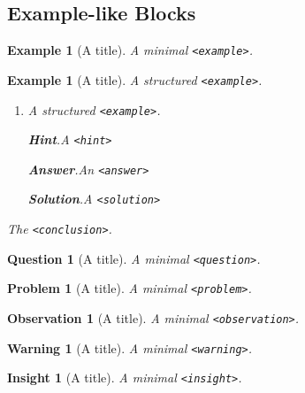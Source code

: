 \documentclass[pdflatex]{sn-jnl}
\theoremstyle{thmstyleone}%
\theoremstyle{thmstyletwo}%
\newtheorem{question}[theorem]{Question}
\newtheorem{problem}[theorem]{Problem}
\newtheorem{example}[theorem]{Example}
\theoremstyle{thmstylethree}%
\newtheorem{warning}[theorem]{Warning}
\newtheorem{insight}[theorem]{Insight}
\newtheorem{observation}[theorem]{Observation}
\newcommand{\blocktitlefont}{\relax}
\newcommand{\mono}[1]{\texttt{#1}}
\numberwithin{equation}{section}
\begin{document}
\subsection{Example-like Blocks}\label{block-samples-example-like}%
\begin{example}[A title]\label{block-samples-example-like-2}%
%
A minimal \mono{<example>}.%
\end{example}
\begin{example}[A title]\label{block-samples-example-like-3}%
%
A structured \mono{<example>}.%
\begin{enumerate}[font=\bfseries,label=(\alph*),ref=\alph*]%
\item{}A structured \mono{<example>}.%
\par\smallskip%
\noindent\textbf{\blocktitlefont Hint}.\hypertarget{block-samples-example-like-3-3-2}{}\quad{}A \mono{<hint>}%
\par\smallskip%
\noindent\textbf{\blocktitlefont Answer}.\hypertarget{block-samples-example-like-3-3-3}{}\quad{}An \mono{<answer>}%
\par\smallskip%
\noindent\textbf{\blocktitlefont Solution}.\hypertarget{block-samples-example-like-3-3-4}{}\quad{}A \mono{<solution>}%
\end{enumerate}%
The \mono{<conclusion>}.%
\end{example}
\begin{question}[A title]\label{block-samples-example-like-4}%
%
A minimal \mono{<question>}.%
\end{question}
\begin{problem}[A title]\label{block-samples-example-like-5}%
%
A minimal \mono{<problem>}.%
\end{problem}
\begin{observation}[A title]\label{block-samples-example-like-6}%
%
A minimal \mono{<observation>}.%
\end{observation}
\begin{warning}[A title]\label{block-samples-example-like-7}%
%
A minimal \mono{<warning>}.%
\end{warning}
\begin{insight}[A title]\label{block-samples-example-like-8}%
%
A minimal \mono{<insight>}.%
\end{insight}
%
%
\typeout{************************************************}
\typeout{************************************************}
%
\end{document}
